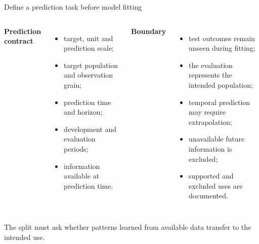 \documentclass[10pt,aspectratio=169]{beamer}
\begin{document}
\begin{frame}{Define a prediction task before model fitting}

\small

\begin{columns}[T]


\textbf{Prediction contract}

\begin{itemize}
  \item target, unit and prediction scale;
  \item target population and observation grain;
  \item prediction time and horizon;
  \item development and evaluation periods;
  \item information available at prediction time.
\end{itemize}


\textbf{Boundary}

\begin{itemize}
  \item test outcomes remain unseen during fitting;
  \item the evaluation represents the intended population;
  \item temporal prediction may require extrapolation;
  \item unavailable future information is excluded;
  \item supported and excluded uses are documented.
\end{itemize}

\end{columns}

\vspace{0.25cm}

\centering
\textcolor{ukudlaRed}{The split must ask whether patterns learned from available data transfer to the intended use.}

\end{frame}
\end{document}

